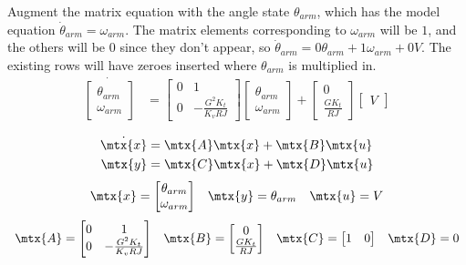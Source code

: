 Augment the matrix equation with the angle state $\theta_{arm}$, which has the
model equation $\dot{\theta}_{arm} = \omega_{arm}$. The matrix elements
corresponding to $\omega_{arm}$ will be $1$, and the others will be $0$ since
they don't appear, so $\dot{\theta}_{arm} = 0\theta_{arm} + 1\omega_{arm} + 0V$.
The existing rows will have zeroes inserted where $\theta_{arm}$ is multiplied
in.
\begin{align*}
  \dot{\begin{bmatrix}
    \theta_{arm} \\
    \omega_{arm}
  \end{bmatrix}} &=
  \begin{bmatrix}
    0 & 1 \\
    0 & -\frac{G^2 K_t}{K_v RJ}
  \end{bmatrix}
  \begin{bmatrix}
    \theta_{arm} \\
    \omega_{arm}
  \end{bmatrix} +
  \begin{bmatrix}
    0 \\
    \frac{GK_t}{RJ}
  \end{bmatrix}
  \begin{bmatrix}
    V
  \end{bmatrix}
\end{align*}
\begin{theorem}
  \begin{align*}
    \dot{\mtx{x}} &= \mtx{A} \mtx{x} + \mtx{B} \mtx{u} \\
    \mtx{y} &= \mtx{C} \mtx{x} + \mtx{D} \mtx{u}
  \end{align*}
  \begin{equation*}
    \begin{array}{ccc}
      \mtx{x} =
      \begin{bmatrix}
        \theta_{arm} \\
        \omega_{arm}
      \end{bmatrix} &
      \mtx{y} = \theta_{arm} &
      \mtx{u} = V
    \end{array}
  \end{equation*}
  \begin{equation}
    \begin{array}{cccc}
      \mtx{A} =
      \begin{bmatrix}
        0 & 1 \\
        0 & -\frac{G^2 K_t}{K_v RJ}
      \end{bmatrix} &
      \mtx{B} =
      \begin{bmatrix}
        0 \\
        \frac{G K_t}{RJ}
      \end{bmatrix} &
      \mtx{C} =
      \begin{bmatrix}
        1 & 0
      \end{bmatrix} &
      \mtx{D} = 0
    \end{array}
  \end{equation}
\end{theorem}

